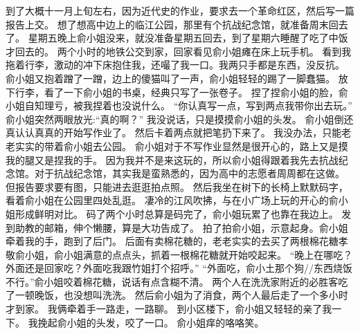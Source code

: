 到了大概十一月上旬左右，因为近代史的作业，要求去一个革命红区，然后写一篇报告上交。
想了想高中边上的临江公园，那里有个抗战纪念馆，就准备周末回去了。
星期五晚上俞小姐没来，就没准备星期五回去，到了星期六睡醒了吃了中饭才回去的。
两个小时的地铁公交到家，回家看见俞小姐瘫在床上玩手机。
看到我拖着行李，激动的冲下床抱住我，还嘬了我一口。我两只手都是东西，没反抗。
俞小姐又抱着蹭了一蹭，边上的傻猫叫了一声，俞小姐轻轻的踢了一脚蠢猫。
放下行李，看了一下俞小姐的书桌，经典只写了一张卷子。
捏了捏俞小姐的脸，俞小姐自知理亏，被我捏着也没说什么。
“你认真写一点，写到两点我带你出去玩。”
俞小姐突然两眼放光:“真的啊？”
我没说话，只是摸摸俞小姐的头发。
俞小姐倒还真认认真真的开始写作业了。
然后卡着两点就把笔扔下来了。
我没办法，只能老老实实的带着俞小姐去公园。
俞小姐对于不写作业显然是很开心的，路上又是摸我的腿又是捏我的手。
因为我并不是来这玩的，所以俞小姐得跟着我先去抗战纪念馆。对于抗战纪念馆，其实我是蛮熟悉的，因为高中的志愿者周周都在这做。
但报告要求要有图，只能进去逛逛拍点照。
然后我坐在树下的长椅上默默码字，看着俞小姐在公园里四处乱逛。
凄冷的江风吹拂，与在小广场上玩的开心的俞小姐形成鲜明对比。
码了两个小时总算是码完了，俞小姐玩累了也靠在我边上。
发到助教的邮箱，伸个懒腰，算是大功告成了。
拍了拍俞小姐，示意起身。俞小姐牵着我的手，跑到了后门。
后面有卖棉花糖的，老老实实的去买了两根棉花糖孝敬俞小姐，俞小姐满意的点点头，抓着一根棉花糖就开始咬起来。
“晚上在哪吃？外面还是回家吃？外面吃我跟竹姐打个招呼。”
“外面吃，俞小土那个狗//东西烧饭不行。”俞小姐咬着棉花糖，说话有点含糊不清。
两个人在洗洗家附近的必胜客吃了一顿晚饭，也没想叫洗洗。
然后俞小姐为了消食，两个人最后走了一个多小时才到家。
我俩牵着手一路走，一路聊。
到小区楼下，俞小姐又轻轻的亲了我一下。
我挽起俞小姐的头发，咬了一口。
俞小姐痒的咯咯笑。

